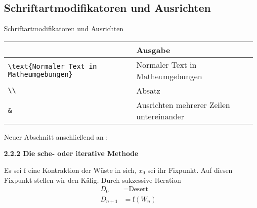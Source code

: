 \documentclass["WS\space 16-17\space -\space LaTeX-Kurs\space -\space Praesentation\space -\space 1.tex"]{subfiles}
\begin{document}
\subsection{Schriftartmodifikatoren und Ausrichten}
\begin{frame}[c]
	\begin{center}
		\large Schriftartmodifikatoren und Ausrichten
	\end{center}
\end{frame}
\begin{frame}[fragile]
	\begin{center}
		\begin{tabular}{ll}
			\toprule
			\color{math-cmd}{Mathe}\color{black}{-Befehl}													&	Ausgabe										\\ \midrule
			\lstinline|\text{Normaler Text in Matheumgebungen}|		&	Normaler Text in Matheumgebungen			\\
			\lstinline|\\|											&	Absatz										\\
			\lstinline|&|											&	Ausrichten mehrerer Zeilen untereinander	\\
			\bottomrule
		\end{tabular}
	\end{center}
	\pause\btVFill
	\Aufgabee
	Neuer Abschnitt anschließend an :
	\begin{outputbox}
		{\large\textbf{2.2.2 Die sche- oder iterative Methode}}
		
		Es sei $\mathrm{f}$ eine Kontraktion der Wüste in sich, $x_0$ sei ihr Fixpunkt. Auf diesen Fixpunkt stellen wir den Käfig. Durch sukzessive Iteration
		\begin{align}
		    D_0 	&= \text{Desert}   \tag{3} \\
	        D_{n+1} &= \mathrm{f}(W_n) \tag{4}
		\end{align}
	\end{outputbox}
	\vspace{0.3cm}
\end{frame}
\end{document}

